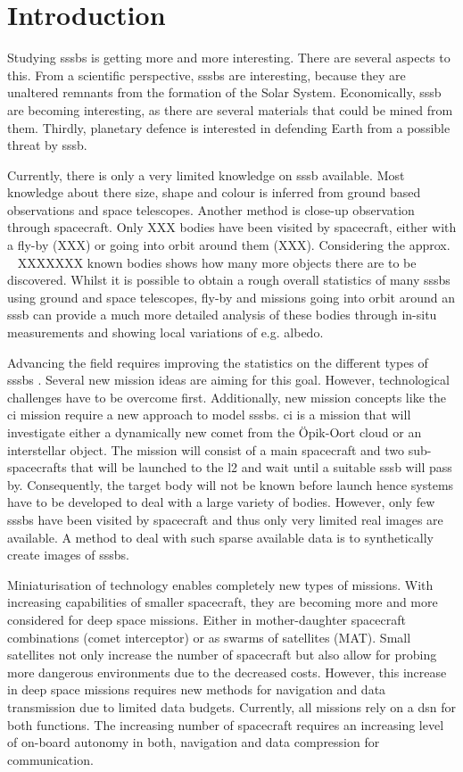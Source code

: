 \section{Introduction}
Studying \gls{sssb}s is getting more and more interesting. There are several aspects to this. From a scientific perspective, \gls{sssb}s are interesting, because they are unaltered remnants from the formation of the Solar System. Economically, \gls{sssb} are becoming interesting, as there are several materials that could be mined from them. Thirdly, planetary defence is interested in defending Earth from a possible threat by \gls{sssb}.

Currently, there is only a very limited knowledge on \gls{sssb} available. Most knowledge about there size, shape and colour is inferred from ground based observations and space telescopes. Another method is close-up observation through spacecraft. Only {\color{red}XXX} bodies have been visited by spacecraft, either with a fly-by {\color{red}(XXX)} or going into orbit around them {\color{red}(XXX)}. Considering the approx. ~{\color{red} XXXXXXX} known bodies shows how many more objects there are to be discovered. Whilst it is possible to obtain a rough overall statistics of many \gls{sssb}s using ground and space telescopes, fly-by and missions going into orbit around an \gls{sssb} can provide a much more detailed analysis of these bodies through in-situ measurements and showing local variations of e.g. albedo.

Advancing the field requires improving the statistics on the different types of \gls{sssb}s \cite{Pajusalu2019CharacterizationMapping}. Several new mission ideas are aiming for this goal. However, technological challenges have to be overcome first. Additionally, new mission concepts like the \gls{ci} mission require a new approach to model \gls{sssb}s. \gls{ci} is a mission that will investigate either a dynamically new comet from the Öpik-Oort cloud or an interstellar object. The mission will consist of a main spacecraft and two sub-spacecrafts that will be launched to the \gls{l2} and wait until a suitable \gls{sssb} will pass by. Consequently, the target body will not be known before launch hence systems have to be developed to deal with a large variety of bodies. However, only few \gls{sssb}s have been visited by spacecraft and thus only very limited real images are available. A method to deal with such sparse available data is to synthetically create images of \gls{sssb}s.

Miniaturisation of technology enables completely new types of missions. With increasing capabilities of smaller spacecraft, they are becoming more and more considered for deep space missions. Either in mother-daughter spacecraft combinations (comet interceptor) or as swarms of satellites (MAT). Small satellites not only increase the number of spacecraft but also allow for probing more dangerous environments due to the decreased costs. However, this increase in deep space missions requires new methods for navigation and data transmission due to limited data budgets. Currently, all missions rely on a \gls{dsn} for both functions. The increasing number of spacecraft requires an increasing level of on-board autonomy in both, navigation and data compression for communication.

